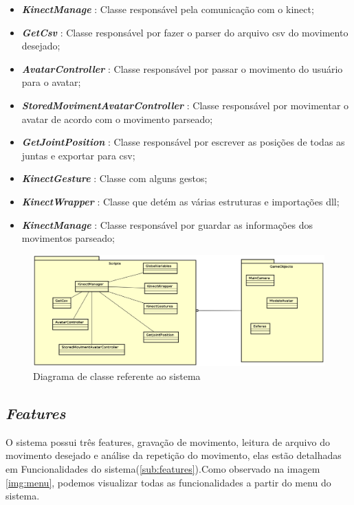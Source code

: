 \begin{itemize}
  \item \textit{\textbf{KinectManage}} : Classe responsável pela comunicação com o kinect;
  \item \textit{\textbf{GetCsv}} : Classe responsável por fazer o parser do arquivo csv do movimento desejado;
  \item \textit{\textbf{AvatarController}} : Classe responsável por passar o movimento do usuário para o avatar;
  \item \textit{\textbf{StoredMovimentAvatarController}} : Classe responsável por movimentar o avatar de acordo com o movimento parseado;
  \item \textit{\textbf{GetJointPosition}} : Classe responsável por escrever as posições de todas as juntas e exportar para csv;
  \item \textit{\textbf{KinectGesture}} : Classe com alguns gestos;
  \item \textit{\textbf{KinectWrapper}} : Classe que detém as várias estruturas e importações dll;
  \item \textit{\textbf{KinectManage}} : Classe responsável por guardar as informações dos movimentos parseado;
\end{itemize}


  \begin{figure}[!h]
  \centering
  \includegraphics [keepaspectratio=true,scale=0.45]{figuras/DiagramaDeClasse.eps}

  \caption{Diagrama de classe referente ao sistema}
  \label{diagramaClasse}
  \end{figure}


\subsection{\textit{Features}}\label{sub:solFeatures}
  O sistema possui três features, gravação de movimento, leitura de arquivo do movimento desejado e análise da repetição do movimento, elas estão
detalhadas em Funcionalidades do sistema(\ref{sub:features}).Como observado na imagem \ref{img:menu}, podemos visualizar todas as funcionalidades a partir do menu do sistema.


